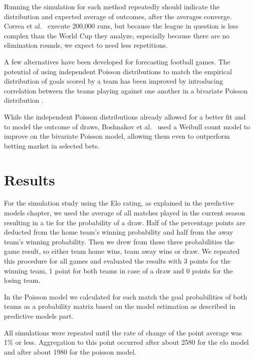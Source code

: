 \documentclass[12pt,a4paper]{article}
\begin{document}
Running the simulation for each method repeatedly should indicate the
distribution and expected average of outcomes, after the averages
converge. Correa et al.~\autocite*{correa} execute 200,000 runs, but
because the league in question is less complex than the World Cup they
analyze, especially because there are no elimination rounds, we expect
to need less repetitions.

A few alternatives have been developed for forecasting football games.
The potential of using independent Poisson distributions to match the
empirical distribution of goals scored by a team has been improved by
introducing correlation between the teams playing against one another in
a bivariate Poisson distribution \textcite{karlis2003}.

While the independent Poisson distributions already allowed for a better
fit and to model the outcome of draws, Boshnakov et
al.~\autocite*{boshnakov2016} used a Weibull count model to improve on
the bivariate Poisson model, allowing them even to outperform betting
market in selected bets.

\hypertarget{results}{%
\section{Results}\label{results}}

For the simulation study using the Elo rating, as explained in the
predictive models chapter, we used the average of all matches played in
the current season resulting in a tie for the probability of a draw.
Half of the percentage points are deducted from the home team's winning
probability and half from the away team's winning probability. Then we
drew from these three probabilities the game result, so either team home
wins, team away wins or draw. We repeated this procedure for all games
and evaluated the results with 3 points for the winning team, 1 point
for both teams in case of a draw and 0 points for the losing team.

In the Poisson model we calculated for each match the goal probabilities
of both teams as a probability matrix based on the model estimation as
described in predictive models part.

All simulations were repeated until the rate of change of the point
average was 1\% or less. Aggregation to this point occurred after about
2580 for the elo model and after about 1980 for the poisson model.
\end{document}
